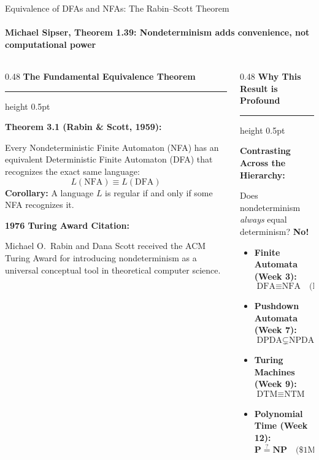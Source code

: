 \documentclass[aspectratio=169, 10pt]{beamer}
\newcommand{\colheader}[1]{%
  {\noindent\footnotesize\bfseries\color{gimpanavy}#1}%
  \vspace{0.02cm}%
  {\color{gimpanavy!30}\hrule height 0.5pt}%
  \vspace{0.05cm}%
}
\newcommand{\cardtitle}[1]{{\noindent\footnotesize\bfseries\color{gimpanavy}#1}\par\vspace{0.03cm}}
\newcommand{\greentitle}[1]{{\noindent\footnotesize\bfseries\color{accentGreen}#1}\par\vspace{0.03cm}}
\begin{document}
\begin{frame}{Equivalence of DFAs and NFAs: The Rabin--Scott Theorem}
  \framesubtitle{Michael Sipser, Theorem 1.39: Nondeterminism adds convenience, not computational power}
  
  \begin{columns}[T]
    \begin{column}{0.48\textwidth}
      \colheader{The Fundamental Equivalence Theorem}
      \begin{tcolorbox}[conceptcard]
        \cardtitle{Theorem 3.1 (Rabin \& Scott, 1959):}
        {\scriptsize
        Every Nondeterministic Finite Automaton (NFA) has an equivalent Deterministic Finite Automaton (DFA) that recognizes the exact same language:
        \[ L(\text{NFA}) \equiv L(\text{DFA}) \]
        \textbf{Corollary:} A language $L$ is regular if and only if some NFA recognizes it.
        }
      \end{tcolorbox}
      \begin{tcolorbox}[spotlightcard]
        \cardtitle{1976 Turing Award Citation:}
        {\scriptsize
        Michael O.~Rabin and Dana Scott received the ACM Turing Award for introducing nondeterminism as a universal conceptual tool in theoretical computer science.
        }
      \end{tcolorbox}
    \end{column}
    
    \begin{column}{0.48\textwidth}
      \colheader{Why This Result is Profound}
      \begin{tcolorbox}[examplecard]
        \greentitle{Contrasting Across the Hierarchy:}
        {\scriptsize
        Does nondeterminism \textit{always} equal determinism? \textbf{No!}
        \begin{itemize}\setlength{\itemsep}{1.2pt}\scriptsize
          \item \textbf{Finite Automata (Week 3):}
          \[ \text{DFA} \equiv \text{NFA} \quad \text{(Identical power)} \]
          \item \textbf{Pushdown Automata (Week 7):}
          \[ \text{DPDA} \subsetneq \text{NPDA} \quad \text{(Nondeterminism strictly wins!)} \]
          \item \textbf{Turing Machines (Week 9):}
          \[ \text{DTM} \equiv \text{NTM} \quad \text{(Same decidable languages)} \]
          \item \textbf{Polynomial Time (Week 12):}
          \[ \mathbf{P} \stackrel{?}{=} \mathbf{NP} \quad \text{(\$1M Millennium Prize Problem)} \]
        \end{itemize}
        }
      \end{tcolorbox}
    \end{column}
  \end{columns}
\end{frame}
\end{document}
